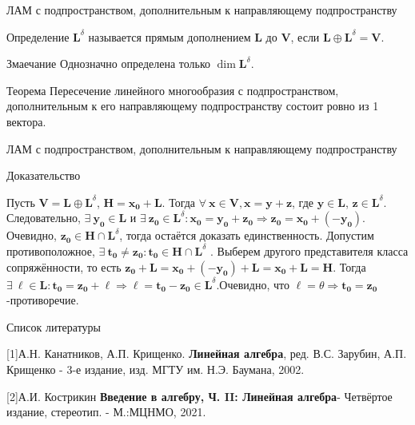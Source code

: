 \documentclass{beamer}
\begin{document}
\begin{frame}{ ЛАМ с подпространством, дополнительным к направляющему подпространству}

\begin{block}{Определение}
    $\mathbf{L}^\delta$ называется прямым дополнением $\mathbf{L}$ до $\mathbf{V}$, если $\mathbf{L}\oplus \mathbf{L}^\delta=\mathbf{V}$.
\end{block}

\begin{block}{Змаечание}
    Однозначно определена только $\dim\mathbf{L}^\delta$.
\end{block}

\begin{block}{Теорема}
 Пересечение линейного многообразия с подпространством, дополнительным к его направляющему подпространству состоит ровно из 1 вектора.   
\end{block}

\end{frame}



\begin{frame}{ ЛАМ с подпространством, дополнительным к направляющему подпространству}
\begin{block}{Доказательство}
    
    Пусть $\mathbf{V}=\mathbf{L}\oplus \mathbf{L}^\delta$, $\mathbf{H}=\mathbf{x_0}+\mathbf{L}$. Тогда $\forall\:\mathbf{x} \in \mathbf{V},    \mathbf{x}=\mathbf{y}+\mathbf{z}$, где $\mathbf{y}\in\mathbf{L}$, $\mathbf{z}\in\mathbf{L}^\delta$.
    Следовательно, $\exists\:\mathbf{y_0}\in\mathbf{L}$ и $\exists\:\mathbf{z_0}\in\mathbf{L}^\delta:\mathbf{x_0}=\mathbf{y_0}+\mathbf{z_0}\Rightarrow\mathbf{z_0}=\mathbf{x_0}+(-\mathbf{y_0})$. Очевидно, $\mathbf{z_0}\in\mathbf{H}\cap\mathbf{L}^\delta$, тогда остаётся доказать единственность. Допустим противоположное, $\exists\: \mathbf{t_0}\neq\mathbf{z_0}:\mathbf{t_0}\in\mathbf{H}\cap\mathbf{L}^\delta$ . Выберем другого представителя класса сопряжённости, то есть $\mathbf{z_0}+\mathbf{L}=\mathbf{x_0}+(-\mathbf{y_0})+\mathbf{L}=\mathbf{x_0}+\mathbf{L}=\mathbf{H}$.
    Тогда
    $\exists\:\mathbf{\ell }\in\mathbf{L}:\mathbf{t_0}=\mathbf{z_0}+\mathbf{\ell }\Rightarrow \mathbf{\ell}=\mathbf{t_0 }-\mathbf{z_0}\in\mathbf{L}^\delta$.Очевидно, что $\mathbf{\ell }=\theta\Rightarrow\mathbf{t_0}=\mathbf{z_0}$-противоречие.
\end{block}

\end{frame}



\begin{frame}{Список литературы}
  
    [1]А.Н. Канатников, А.П. Крищенко. {\bf Линейная алгебра}, ред. В.С. Зарубин, А.П. Крищенко
    - 3-е издание, изд. МГТУ им. Н.Э. Баумана, 2002.
    
    [2]А.И. Кострикин {\bf Введение в алгебру, Ч. II: Линейная алгебра}- Четвёртое издание, стереотип. - М.:МЦНМО, 2021.
\end{frame}
\end{document}
